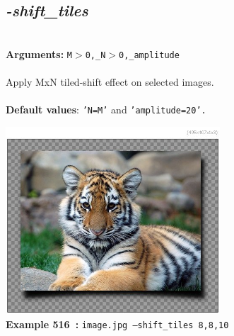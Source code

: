 \documentclass[a4paper,11pt,twoside]{book}
\begin{document}
\subsection{\emph{-shift\_tiles} }\vspace*{-0.5em}
~\\\textbf{Arguments: } 
{\small \texttt{M$>$0,\_N$>$0,\_amplitude}}\\~\\
Apply MxN tiled-shift effect on selected images.
~\\~\\\textbf{Default values}: {\small \texttt{'N=M'} and \texttt{'amplitude=20'.}}
\begin{center}\includegraphics[keepaspectratio=true,height=7cm,width=\textwidth]{img/gmic_def516.jpg}\\
{\footnotesize \textbf{Example 516~:} \texttt{image.jpg --shift\_tiles 8,8,10}}
\end{center}
\end{document}
